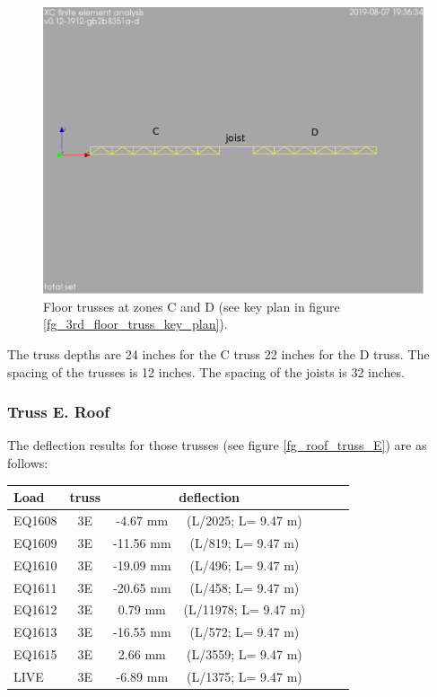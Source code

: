 \begin{figure}
  \begin{center}
  \includegraphics[width=120mm]{figures/floor_truss_CD}
  \end{center}
  \caption{Floor trusses at zones C and D (see key plan in figure \ref{fg_3rd_floor_truss_key_plan}).}\label{fg_floor_truss_CD}
\end{figure}

\noindent The truss depths are 24 inches for the C truss 22 inches for the D truss. The spacing of the trusses is 12 inches. The spacing of the joists is 32 inches. 

\subsubsection{Truss E. Roof}
The deflection results for those trusses (see figure \ref{fg_roof_truss_E}) are as follows:

\begin{center}
  \begin{scriptsize}
  \begin{tabular}{|l|c|c|c|c|c|c|}
    \hline
    \textbf{Load} & \textbf{truss} & \multicolumn{2}{c|}{\textbf{deflection}} \\
    \hline
EQ1608 & 3E & -4.67 mm & (L/2025; L= 9.47 m) \\
EQ1609 & 3E & -11.56 mm & (L/819; L= 9.47 m) \\
EQ1610 & 3E & -19.09 mm & (L/496; L= 9.47 m) \\
EQ1611 & 3E & -20.65 mm & (L/458; L= 9.47 m) \\
EQ1612 & 3E & 0.79 mm & (L/11978; L= 9.47 m) \\
EQ1613 & 3E & -16.55 mm & (L/572; L= 9.47 m) \\
EQ1615 & 3E & 2.66 mm & (L/3559; L= 9.47 m) \\
LIVE & 3E & -6.89 mm & (L/1375; L= 9.47 m) \\
\hline
  \end{tabular}
  \end{scriptsize}
\end{center}

